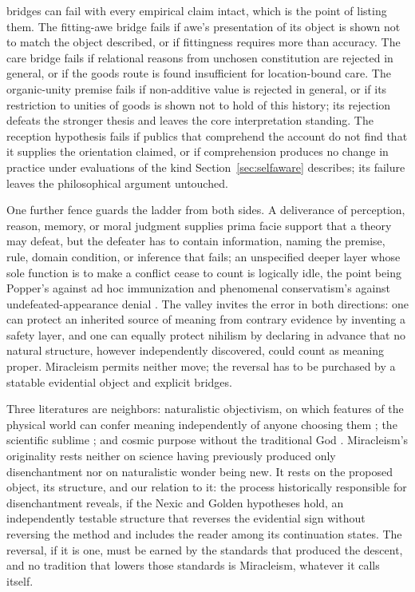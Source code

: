 bridges can fail with every empirical claim intact, which is the point of
listing them. The fitting-awe bridge fails if awe's presentation of its object
is shown not to match the object described, or if fittingness requires more
than accuracy. The care bridge fails if relational reasons from unchosen
constitution are rejected in general, or if the goods route is found
insufficient for location-bound care. The organic-unity premise fails if non-additive value is
rejected in general, or if its restriction to unities of goods is shown not
to hold of this history; its rejection defeats the stronger thesis and leaves
the core interpretation standing. The reception hypothesis fails if publics that comprehend
the account do not find that it supplies the orientation claimed, or if
comprehension produces no change in practice under evaluations of the kind
Section~\ref{sec:selfaware} describes; its failure leaves the philosophical
argument untouched.

One further fence guards the ladder from both sides. A deliverance of
perception, reason, memory, or moral judgment supplies prima facie support
that a theory may defeat, but the defeater has to contain information, naming
the premise, rule, domain condition, or inference that fails; an unspecified
deeper layer whose sole function is to make a conflict cease to count is
logically idle, the point being Popper's against ad hoc immunization
\cite{Popper63} and phenomenal conservatism's against undefeated-appearance
denial \cite{Huemer07}. The valley invites the error in both directions: one
can protect an inherited source of meaning from contrary evidence by inventing
a safety layer, and one can equally protect nihilism by declaring in advance
that no natural structure, however independently discovered, could count as
meaning proper. Miracleism permits neither move; the reversal has to be
purchased by a statable evidential object and explicit bridges.

Three literatures are neighbors: naturalistic objectivism, on which features
of the physical world can confer meaning independently of anyone choosing
them \cite{MetzSEP}; the scientific sublime \cite{Gross18}; and cosmic
purpose without the traditional God \cite{Mulgan15,Goff23}. Miracleism's
originality rests neither on science having previously produced only
disenchantment nor on naturalistic wonder being new. It rests on the proposed
object, its structure, and our relation to it: the process historically
responsible for disenchantment reveals, if the Nexic and Golden hypotheses
hold, an independently testable structure that reverses the evidential sign
without reversing the method and includes the reader among its continuation
states. The reversal, if it is one, must be earned by the standards that
produced the descent, and no tradition that lowers those standards is
Miracleism, whatever it calls itself.

